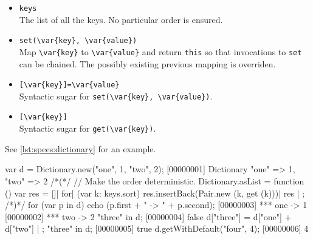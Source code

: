 \begin{itemize}
\item \lstinline|keys|\\
  The list of all the keys.  No particular order is ensured.

\item \lstinline|set(\var{key}, \var{value})|\\
  Map \lstinline|\var{key}| to \lstinline|\var{value}| and return
  \lstinline|this| so that invocations to \lstinline|set| can be
  chained.  The possibly existing previous mapping is overriden.

\item \lstinline|[\var{key}]=\var{value}|\\
  Syntactic sugar for \lstinline|set(\var{key}, \var{value})|.

\item \lstinline|[\var{key}]|\\
  Syntactic sugar for \lstinline|get(\var{key})|.
\end{itemize}

See \autoref{lst:specs:dictionary} for an example.

\begin{urbiscript}[caption=Dictionaries, label=lst:specs:dictionary]
var d = Dictionary.new("one", 1, "two", 2);
[00000001] Dictionary {"one" => 1, "two" => 2}
/*(*/
  // Make the order deterministic.
  Dictionary.asList =
  function ()
  {
    var res = []|
    for| (var k: keys.sort)
      res.insertBack(Pair.new (k, get (k)))|
    res
  } | {};
/*)*/
for (var p in d)
  echo (p.first + " -> " + p.second);
[00000003] *** one -> 1
[00000002] *** two -> 2
"three" in d;
[00000004] false
d["three"] = d["one"] + d["two"] | {};
"three" in d;
[00000005] true
d.getWithDefault("four", 4);
[00000006] 4
\end{urbiscript}

